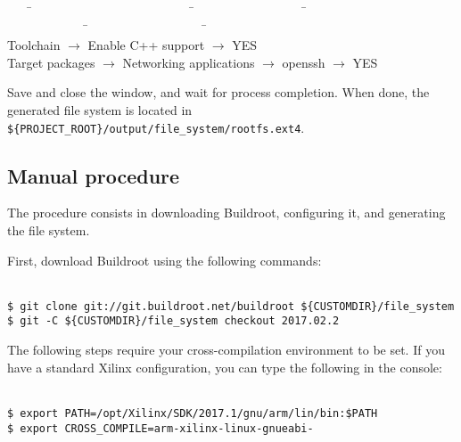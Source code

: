 \documentclass[openany,a4paper]{book}
\begin{document}
\begin{tabbing}
\kill \ \ \ \= \ \ \ \ \ \ \ \ \ \ \ \ \ \ \ \ \ \ \ \ \ \ \ \ \ \ \= \ \ \ \ \ \ \ \ \ \ \ \ \ \ \ \ \ \ \= \ \ \ \ \ \ \ \ \ \ \ \ \ \ \ \ \ \ \ \ \ \ \ \ \ \ \ \ \ \ \ \ \ \ \ \ \ \= \ \ \ \ \ \ \ \ \ \ \ \ \ \ \ \ \ \ \ \= \ \ \ \ \ \ \ \ \ \ \ \ \ \ \ \= \\
\> Toolchain                          \>                                                             \> $\rightarrow$ Enable C++ support                         \> $\rightarrow$ YES \\
\> Target packages                    \>                                                             \> $\rightarrow$ Networking applications                    \> $\rightarrow$ openssh    \> $\rightarrow$ YES \\
\end{tabbing}

Save and close the window, and wait for process completion.
When done, the generated file system is located in \nolinkurl{${PROJECT_ROOT}/output/file_system/rootfs.ext4}.

\subsection{Manual procedure}

The procedure consists in downloading Buildroot, configuring it, and generating the file system.

First, download Buildroot using the following commands:

\begin{tabbing}
\kill \hspace{1cm} \= \\
\> \texttt{\$ git clone git://git.buildroot.net/buildroot \$\{CUSTOMDIR\}/file\_system} \\
\> \texttt{\$ git -C \$\{CUSTOMDIR\}/file\_system checkout 2017.02.2} \\
\end{tabbing}

The following steps require your cross-compilation environment to be set.
If you have a standard Xilinx configuration, you can type the following in the console:

\begin{tabbing}
\kill \hspace{1cm} \= \\
\> \texttt{\$ export PATH=/opt/Xilinx/SDK/2017.1/gnu/arm/lin/bin:\$PATH}\\
\> \texttt{\$ export CROSS\_COMPILE=arm-xilinx-linux-gnueabi-}\\
\end{tabbing}
\end{document}
